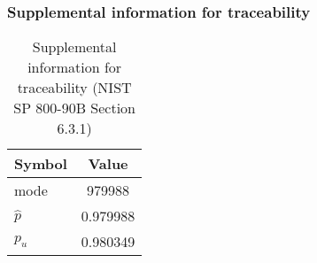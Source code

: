 \documentclass[a3paper,xelatex,english]{bxjsarticle}
\begin{document}
\subsubsection{Supplemental information for traceability}
\renewcommand{\arraystretch}{1.8}
\begin{table}[h]
\caption{Supplemental information for traceability (NIST SP 800-90B Section 6.3.1)}
\begin{center}
\begin{tabular}{|l|c|}
\hline 
\rowcolor{anotherlightblue} %
Symbol				& Value \\ \hline 
mode				&   979988\\ \hline 
$\hat{p}$ 			& 0.979988\\ \hline
$p_u$				& 0.980349\\ \hline
\end{tabular}
\end{center}
\end{table}
\renewcommand{\arraystretch}{1.4}
\clearpage
\end{document}
